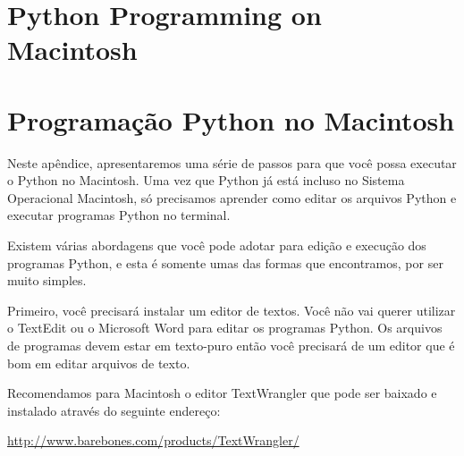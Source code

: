 
\chapter{Python Programming on Macintosh}
\chapter{Programação Python no Macintosh}


Neste apêndice, apresentaremos uma série de passos para que você possa 
executar o Python no Macintosh. Uma vez que Python já está incluso no
Sistema Operacional Macintosh, só precisamos aprender como editar os arquivos 
Python e executar programas Python no terminal.


Existem várias abordagens que você pode adotar para edição e execução dos 
programas Python, e esta é somente umas das formas que encontramos, por ser 
muito simples.


Primeiro, você precisará instalar um editor de textos. Você não vai querer 
utilizar o TextEdit ou o Microsoft Word para editar os programas Python. Os 
arquivos de programas devem estar em texto-puro então você precisará de um 
editor que é bom em editar arquivos de texto.


Recomendamos para Macintosh o editor TextWrangler que pode ser baixado e 
instalado através do seguinte endereço:

\url{http://www.barebones.com/products/TextWrangler/}


